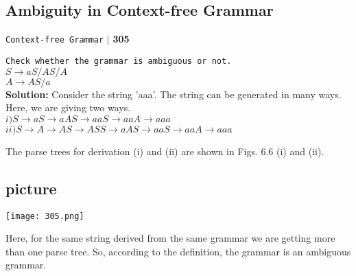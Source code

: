 \documentclass[9pt]{beamer}
\begin{document}
\begin{frame}

\section*{Ambiguity in Context-free Grammar }
\begin{flushright}
 \texttt{Context-free Grammar} \hspace*{0.10cm}\textbf{$|$} \textbf{305}\hspace*{0.5cm}
\end{flushright}

\vspace*{1cm}
\hspace*{0.1cm} \texttt{Check whether the grammar is ambiguous or not.}\\

\vspace*{0.3cm}
\hspace*{4cm} $S \rightarrow aS/AS/A$ \\
\hspace*{4cm} $A \rightarrow AS/a$ \\

\vspace*{0.5cm}
\textbf{Solution:} Consider the string 'aaa'. The string can be generated in many ways. Here, we are giving two
ways.\\
\vspace*{0.2cm}
\hspace*{0.5cm} $i) S \rightarrow aS \rightarrow aAS \rightarrow aaS \rightarrow aaA \rightarrow aaa$ \\
\hspace*{0.5cm} $ii) S \rightarrow A \rightarrow AS \rightarrow ASS \rightarrow aAS \rightarrow aaS \rightarrow aaA \rightarrow aaa$ \\
\end{frame}

\begin{frame}
The parse trees for derivation (i) and (ii) are shown in Figs. 6.6 (i) and (ii).\\

\begin{center}
\section{picture}
\texttt{[image: 305.png]}
\end{center}

\hspace*{0.5cm} Here, for the same string derived from the same grammar we are getting more than one parse tree.
So, according to the definition, the grammar is an ambiguous grammar.\\

\vspace*{0.5cm}
\end{frame}
\end{document}
